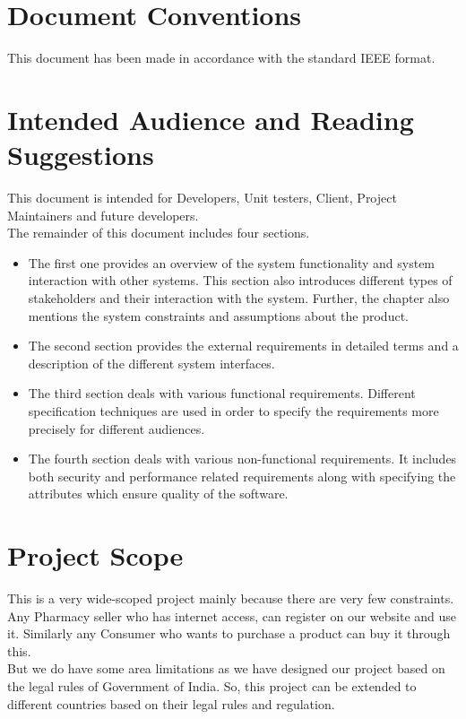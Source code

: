 \documentclass{scrreprt}
\begin{document}
\section{Document Conventions}
This document has been made in accordance with the standard IEEE format.
\section{Intended Audience and Reading Suggestions}
 This document is intended for Developers, Unit testers, Client, Project Maintainers and future developers.\\

 The remainder of this document includes four sections.\\
\begin{itemize}
\item The first one provides an overview of the system functionality and system interaction with other systems. This section also introduces different types of stakeholders and their interaction with the system. Further, the chapter also mentions the system constraints and assumptions about the product.\\

\item The second section provides the external requirements in detailed terms and a description of the different system interfaces.\\

\item The third section deals with various functional requirements. Different specification techniques are used in order to specify the requirements more precisely for different audiences.\\

\item The fourth section deals with various non-functional requirements. It includes both security and performance related requirements along with specifying the attributes which ensure quality of the software.
\end{itemize}
\section{Project Scope}
 This is a very wide-scoped project mainly because there are very few constraints. Any Pharmacy seller who has internet access, can register on our website and use it. Similarly any Consumer who wants to purchase a product can buy it through this.   \\
 But we do have some area limitations as we have designed our project based on the legal rules of Government of India. So, this project can be extended to different countries based on their legal rules and regulation.
\end{document}

